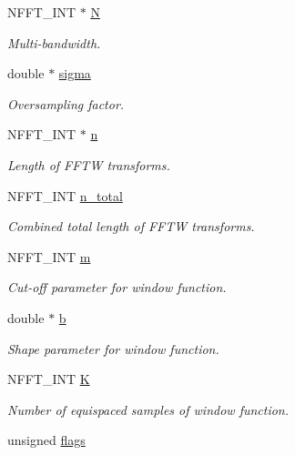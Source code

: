 \begin{DoxyCompactItemize}
N\-F\-F\-T\-\_\-\-I\-N\-T $\ast$ \hyperlink{structnfft__plan_af100fe04b5d67e9b890e787b4e994f97}{N}
\begin{DoxyCompactList}\small\item\em Multi-\/bandwidth. \end{DoxyCompactList}\item 
double $\ast$ \hyperlink{structnfft__plan_a09340f6465c23f3d94636f4f0da30f8a}{sigma}
\begin{DoxyCompactList}\small\item\em Oversampling factor. \end{DoxyCompactList}\item 
N\-F\-F\-T\-\_\-\-I\-N\-T $\ast$ \hyperlink{structnfft__plan_a8205995ab8bacd26adecbc93c73a0914}{n}
\begin{DoxyCompactList}\small\item\em Length of F\-F\-T\-W transforms. \end{DoxyCompactList}\item 
N\-F\-F\-T\-\_\-\-I\-N\-T \hyperlink{structnfft__plan_a9ffe9fb93c209bfc0d6a1386cb450379}{n\-\_\-total}
\begin{DoxyCompactList}\small\item\em Combined total length of F\-F\-T\-W transforms. \end{DoxyCompactList}\item 
N\-F\-F\-T\-\_\-\-I\-N\-T \hyperlink{structnfft__plan_aa465d49bdc08234cb1544fcbc0376c4a}{m}
\begin{DoxyCompactList}\small\item\em Cut-\/off parameter for window function. \end{DoxyCompactList}\item 
\hypertarget{structnfft__plan_a724949f4916b28f484eb447ee1a77f0a}{double $\ast$ \hyperlink{structnfft__plan_a724949f4916b28f484eb447ee1a77f0a}{b}}\label{structnfft__plan_a724949f4916b28f484eb447ee1a77f0a}

\begin{DoxyCompactList}\small\item\em Shape parameter for window function. \end{DoxyCompactList}\item 
N\-F\-F\-T\-\_\-\-I\-N\-T \hyperlink{structnfft__plan_a81032c3e1764804561a17941166a9272}{K}
\begin{DoxyCompactList}\small\item\em Number of equispaced samples of window function. \end{DoxyCompactList}\item 
\hypertarget{structnfft__plan_af392687df349ee7632d484a11de5a0f3}{unsigned \hyperlink{structnfft__plan_af392687df349ee7632d484a11de5a0f3}{flags}}\label{structnfft__plan_af392687df349ee7632d484a11de5a0f3}


\end{DoxyCompactItemize}
